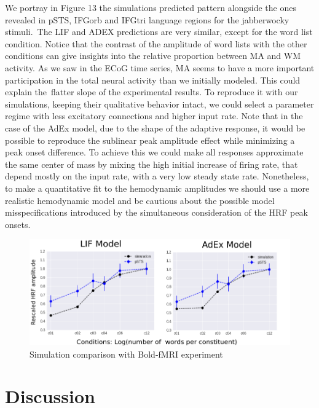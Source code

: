 \documentclass[10pt]{article}
\begin{document}
We portray in Figure 13 the simulations predicted pattern alongside the ones revealed in pSTS, IFGorb and IFGtri language regions for the jabberwocky stimuli.~The LIF and ADEX predictions are very similar, except for the word list condition.
Notice that the contrast of the amplitude of word lists with the other conditions can give insights into the relative proportion between MA and WM activity.
As we saw in the ECoG time series, MA seems to have a more important participation in the total neural activity than we initially modeled.
This could explain the~flatter slope of the experimental results.
To reproduce it with our simulations, keeping their qualitative behavior intact, we could select a parameter regime with less excitatory connections and higher input rate.
Note that in the case of the AdEx model, due to the shape of the adaptive response, it would be possible to reproduce the sublinear peak amplitude effect while minimizing a peak onset difference.
To achieve this we could make all responses approximate the same center of mass by mixing the high initial increase of firing rate, that depend mostly on the input rate, with a very low steady state rate.
Nonetheless, to make a quantitative fit to the hemodynamic amplitudes we should use a more realistic hemodynamic model and be cautious about the possible model misspecifications introduced by the simultaneous consideration of the HRF peak onsets.

\begin{figure}[h!]
  \begin{center}
    \includegraphics[width=1.00\columnwidth]{figures/pnas_comparison-02/pnas_comparison-02}
    \caption{{Simulation comparison with Bold-fMRI experiment
        {\label{395077}}%
      }}
  \end{center}
\end{figure}

\section{Discussion}
\end{document}
